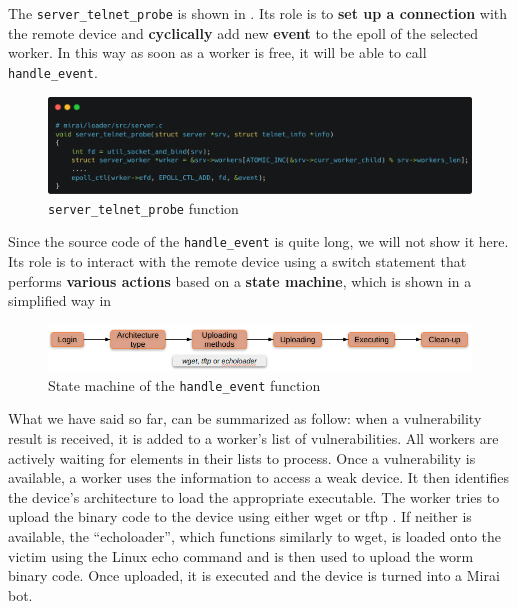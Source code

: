 The \texttt{server\_telnet\_probe} is shown in . Its role is to \textbf{set up a connection} with the remote device and \textbf{cyclically} add new \textbf{event} to the epoll of the selected worker. In this way as soon as a worker is free, it will be able to call \texttt{handle\_event}.

\begin{figure}[ht]
    \centering
    \includegraphics[scale=0.15]{resources/images/sever_telnet_probe.png}
    \caption{\texttt{server\_telnet\_probe} function}
    \label{fig:server-telnet-probe}
\end{figure}

Since the source code of the \texttt{handle\_event} is quite long, we will not show it here. Its role is to interact with the remote device using a switch statement that performs \textbf{various actions} based on a \textbf{state machine}, which is shown in a simplified way in 

\begin{figure}[ht]
    \centering
    \includegraphics[scale=0.5]{resources/images/state-machine.png}
    \caption{State machine of the \texttt{handle\_event} function}
    \label{fig:state-machine}
\end{figure}

What we have said so far, can be summarized as follow: when a vulnerability result is received, it is added to a worker's list of vulnerabilities. All workers are actively waiting for elements in their lists to process. Once a vulnerability is available, a worker uses the information to access a weak device. It then identifies the device's architecture to load the appropriate executable. The worker tries to upload the binary code to the device using either wget or tftp . If neither is available, the ``echoloader'', which functions similarly to wget, is loaded onto the victim using the Linux echo command and is then used to upload the worm binary code. Once uploaded, it is executed and the device is turned into a Mirai bot.\cite{de2018ddos}

